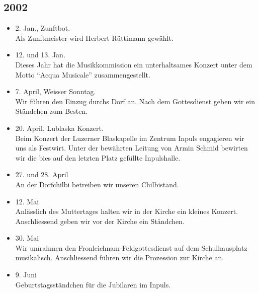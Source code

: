 \subsection{2002}

\begin{history}

    \begin{itemize}

        \item 2. Jan., Zunftbot.\\
              Als Zunftmeister wird Herbert Rüttimann gewählt.

        \item 12. und 13. Jan.\\
              Dieses Jahr hat die Musikkommission ein unterhaltsames Konzert unter dem
              Motto \enquote{Acqua Musicale} zusammengestellt.

        \item 7. April, Weisser Sonntag. \\
              Wir führen den Einzug durchs Dorf an. Nach dem
              Gottesdienst geben wir ein Ständchen zum Besten.

        \item 20. April, Lublaska Konzert.\\
              Beim Konzert der Luzerner Blaskapelle im Zentrum
              Inpuls engagieren wir uns als Festwirt. Unter der bewährten Leitung von
              Armin Schmid bewirten wir die bies auf den letzten Platz gefüllte
              Inpulshalle.

        \item 27. und 28. April\\
              An der Dorfchilbi betreiben wir unseren Chilbistand.

        \item 12. Mai\\
              Anlässlich des Muttertages halten wir in der Kirche ein kleines Konzert.
              Anschliessend geben wir vor der Kirche ein Ständchen.

        \item 30. Mai\\
              Wir umrahmen den Fronleichnam-Feldgottesdienst auf dem Schulhausplatz
              musikalisch. Anschliessend führen wir die Prozession zur Kirche an.

        \item 9. Juni\\
              Geburtstagsständchen für die Jubilaren im Inpuls.


\end{itemize}
\end{history}
